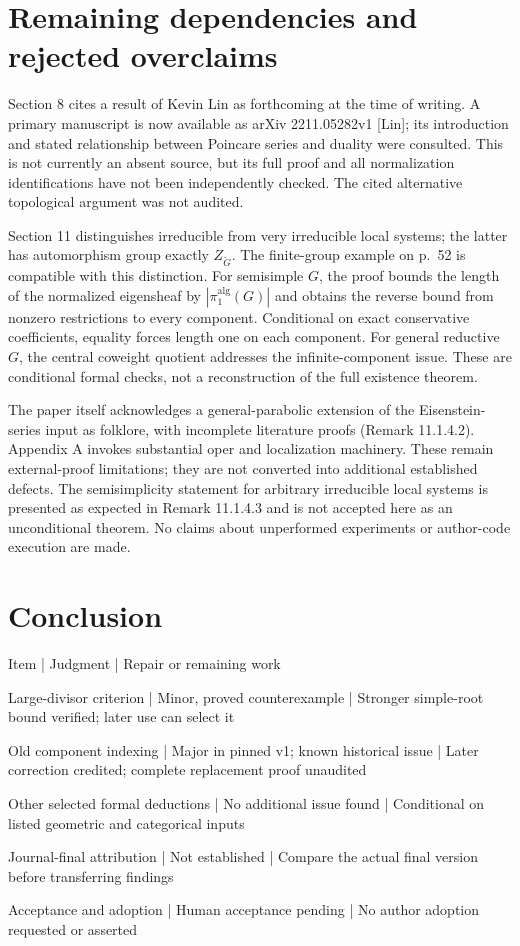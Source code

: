 \documentclass[10pt]{article}
\begin{document}
\section*{Remaining dependencies and rejected overclaims}
Section 8 cites a result of Kevin Lin as forthcoming at the time of writing. A primary manuscript is now available as arXiv 2211.05282v1 [Lin]; its introduction and stated relationship between Poincare series and duality were consulted. This is not currently an absent source, but its full proof and all normalization identifications have not been independently checked. The cited alternative topological argument was not audited.\par
Section 11 distinguishes irreducible from very irreducible local systems; the latter has automorphism group exactly \(Z_{\check G}\). The finite-group example on p. 52 is compatible with this distinction. For semisimple \(G\), the proof bounds the length of the normalized eigensheaf by \(|\pi_1^{\mathrm{alg}}(G)|\) and obtains the reverse bound from nonzero restrictions to every component. Conditional on exact conservative coefficients, equality forces length one on each component. For general reductive \(G\), the central coweight quotient addresses the infinite-component issue. These are conditional formal checks, not a reconstruction of the full existence theorem.\par
The paper itself acknowledges a general-parabolic extension of the Eisenstein-series input as folklore, with incomplete literature proofs (Remark 11.1.4.2). Appendix A invokes substantial oper and localization machinery. These remain external-proof limitations; they are not converted into additional established defects. The semisimplicity statement for arbitrary irreducible local systems is presented as expected in Remark 11.1.4.3 and is not accepted here as an unconditional theorem. No claims about unperformed experiments or author-code execution are made.\par
\section*{Conclusion}
Item | Judgment | Repair or remaining work\par
Large-divisor criterion | Minor, proved counterexample | Stronger simple-root bound verified; later use can select it\par
Old component indexing | Major in pinned v1; known historical issue | Later correction credited; complete replacement proof unaudited\par
Other selected formal deductions | No additional issue found | Conditional on listed geometric and categorical inputs\par
Journal-final attribution | Not established | Compare the actual final version before transferring findings\par
Acceptance and adoption | Human acceptance pending | No author adoption requested or asserted\par
\end{document}

